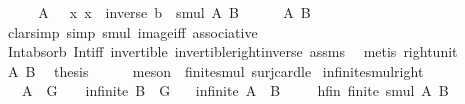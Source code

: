 \begin{isabellebody}
%
\isadelimproof
%
\endisadelimproof
%
\isatagproof
{}\isamarkupfalse%
\ {\isacharminus}{\kern0pt}\isanewline
\ \ \isamarkupfalse%
\ {\isachardoublequoteopen}A\ {\isasymsubseteq}\ {\isacharparenleft}{\kern0pt}{\isasymlambda}\ x{\isachardot}{\kern0pt}\ x\ {\isasymcdot}\ {\isacharparenleft}{\kern0pt}inverse\ b{\isacharparenright}{\kern0pt}{\isacharparenright}{\kern0pt}\ {\isacharbackquote}{\kern0pt}\ smul\ A\ B{\isachardoublequoteclose}\isanewline
\ \ \ \ \isamarkupfalse%
\ A\ B\isanewline
\ \ \ \ \isamarkupfalse%
\ {\isacharparenleft}{\kern0pt}clarsimp\ simp{\isacharcolon}{\kern0pt}\ smul\ image{\isacharunderscore}{\kern0pt}iff\ associative{\isacharparenright}{\kern0pt}\ \ \ \ \ \isanewline
\ \ \ \ \isamarkupfalse%
\ Int{\isacharunderscore}{\kern0pt}absorb{}\ Int{\isacharunderscore}{\kern0pt}iff\ invertible\ invertible{\isacharunderscore}{\kern0pt}right{\isacharunderscore}{\kern0pt}inverse\ assms{\isacharparenleft}{\kern0pt}{}{\isacharparenright}{\kern0pt}\ \isamarkupfalse%
\ {\isacharparenleft}{\kern0pt}metis\ right{\isacharunderscore}{\kern0pt}unit{\isacharparenright}{\kern0pt}\isanewline
\ \ \isamarkupfalse%
\ A\ B\ \isamarkupfalse%
\ {\isacharquery}{\kern0pt}thesis\isanewline
\ \ \ \ \isamarkupfalse%
\ {\isacharparenleft}{\kern0pt}meson\ \ finite{\isacharunderscore}{\kern0pt}smul\ surj{\isacharunderscore}{\kern0pt}card{\isacharunderscore}{\kern0pt}le{\isacharparenright}{\kern0pt}\isanewline
{}\isamarkupfalse%
%
\endisatagproof
{\isafoldproof}%
%
\isadelimproof
\isanewline
%
\endisadelimproof
\isanewline
\isanewline
{}\isamarkupfalse%
\ infinite{\isacharunderscore}{\kern0pt}smul{\isacharunderscore}{\kern0pt}right{\isacharcolon}{\kern0pt}\isanewline
\ \ \ {\isachardoublequoteopen}A\ {\isasyminter}\ G\ {\isasymnoteq}\ {\isacharbraceleft}{\kern0pt}{\isacharbraceright}{\kern0pt}{\isachardoublequoteclose}\ \ {\isachardoublequoteopen}infinite\ {\isacharparenleft}{\kern0pt}B\ {\isasyminter}\ G{\isacharparenright}{\kern0pt}{\isachardoublequoteclose}\isanewline
\ \ \ {\isachardoublequoteopen}infinite\ {\isacharparenleft}{\kern0pt}A\ {\isasymcdots}\ B{\isacharparenright}{\kern0pt}{\isachardoublequoteclose}\ \isanewline
%
\isadelimproof
%
\endisadelimproof
%
\isatagproof
{}\isamarkupfalse%
\isanewline
\ \ \isamarkupfalse%
\ hfin{\isacharcolon}{\kern0pt}\ {\isachardoublequoteopen}finite\ {\isacharparenleft}{\kern0pt}smul\ A\ B{\isacharparenright}{\kern0pt}{\isachardoublequoteclose}\isanewline

\end{isabellebody}
